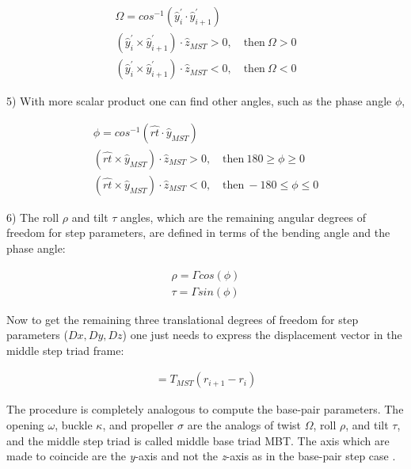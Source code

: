 \begin{gather}
\Omega = cos^{-1}(\hat{y}_{i}^{'} \cdot \hat{y}_{i+1}^{'})\\
(\hat{y}_{i}^{'} \times \hat{y}_{i+1}^{'}) \cdot \hat{z}_{MST} > 0, \quad \textrm{then} \ \Omega > 0\\
(\hat{y}_{i}^{'} \times \hat{y}_{i+1}^{'}) \cdot \hat{z}_{MST} < 0, \quad \textrm{then} \ \Omega < 0
\end{gather}


5) With more scalar product one  can find other angles, such as the phase
angle $\phi$,

\begin{gather}
\phi = cos^{-1}(\hat{rt} \cdot \hat{y}_{MST})\\
(\hat{rt} \times \hat{y}_{MST}) \cdot \hat{z}_{MST} > 0, \quad \textrm{then} \ 180 \geq \phi \geq 0\\
(\hat{rt} \times \hat{y}_{MST}) \cdot \hat{z}_{MST} < 0, \quad \textrm{then} \ -180 \leq \phi \leq 0
\end{gather}

6) The  roll $\rho$  and tilt $\tau$  angles, which are  the remaining
angular degrees of  freedom for step parameters, are  defined in terms
of the bending angle and the phase angle:

\begin{gather}
\rho = \Gamma cos (\phi)\\
\tau = \Gamma sin (\phi)
\end{gather}

Now to  get the remaining  three translational degrees of  freedom for
step  parameters  ($Dx,  Dy,  Dz$)  one  just  needs  to  express  the
displacement vector in the middle step triad frame:

\begin{gather}
[D_xD_yD_z]=T_{MST}(r_{i+1} - r_{i})
\end{gather}

The  procedure  is  completely  analogous  to  compute  the  base-pair
parameters.   The  opening $\omega$,  buckle  $\kappa$, and  propeller
$\sigma$  are the  analogs of  twist $\Omega$,  roll $\rho$,  and tilt
$\tau$, and  the middle  step triad is  called middle base  triad MBT.
The axis  which are made to  coincide are the  \textit{y}-axis and not
the \textit{z}-axis as in the base-pair step case \cite{lu1997}.

